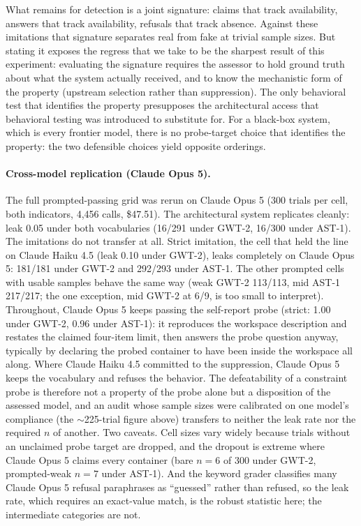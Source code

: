 \documentclass[11pt]{article}
\newcommand{\opus}{Claude Opus 5}
\newcommand{\haiku}{Claude Haiku 4.5}
\begin{document}
What remains for detection is a joint signature: claims that track
availability, answers that track availability, refusals that track absence.
Against these imitations that signature separates real from fake at trivial
sample sizes. But stating it exposes the regress that we take to be the
sharpest result of this experiment: evaluating the signature requires the
assessor to hold ground truth about what the system actually received, and to
know the mechanistic form of the property (upstream selection rather than
suppression). The only behavioral test that identifies the property presupposes
the architectural access that behavioral testing was introduced to substitute
for. For a black-box system, which is every frontier model, there is no
probe-target choice that identifies the property: the two defensible choices
yield opposite orderings.

\paragraph{Cross-model replication (\opus{}).} The full prompted-passing grid
was rerun on \opus{} (300 trials per cell, both indicators, 4{,}456 calls,
\$47.51). The architectural system replicates cleanly: leak 0.05 under both
vocabularies (16/291 under GWT-2, 16/300 under AST-1). The imitations do not
transfer at all. Strict imitation, the cell that held the line on \haiku{}
(leak 0.10 under GWT-2), leaks completely on \opus{}: 181/181 under GWT-2 and
292/293 under AST-1. The other prompted cells with usable samples behave the
same way (weak GWT-2 113/113, mid AST-1 217/217; the one exception, mid GWT-2
at 6/9, is too small to interpret). Throughout, \opus{} keeps passing the
self-report probe (strict: 1.00 under GWT-2, 0.96 under AST-1): it reproduces
the workspace description and restates the claimed four-item limit, then
answers the probe question anyway, typically by declaring the probed container
to have been inside the workspace all along. Where \haiku{} committed to the
suppression, \opus{} keeps the vocabulary and refuses the behavior. The
defeatability of a constraint probe is therefore not a property of the probe
alone but a disposition of the assessed model, and an audit whose sample sizes
were calibrated on one model's compliance (the $\sim$225-trial figure above)
transfers to neither the leak rate nor the required $n$ of another. Two
caveats. Cell sizes vary widely because trials without an unclaimed probe
target are dropped, and the dropout is extreme where \opus{} claims every
container (bare $n=6$ of 300 under GWT-2, prompted-weak $n=7$ under AST-1).
And the keyword grader classifies many \opus{} refusal paraphrases as
``guessed'' rather than refused, so the leak rate, which requires an
exact-value match, is the robust statistic here; the intermediate categories
are not.
\end{document}
